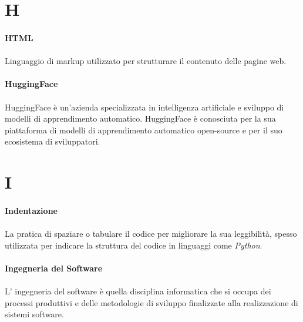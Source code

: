 \documentclass[10pt, a4paper]{article}
\begin{document}
\section{H}
\vspace{2em}
\paragraph{HTML}\noindent\hrulefill
\paragraph{}Linguaggio di markup utilizzato per strutturare il contenuto delle pagine web.

\vspace{2em}
\paragraph{HuggingFace}\noindent\hrulefill
\paragraph{}HuggingFace è un'azienda specializzata in intelligenza artificiale e sviluppo di modelli di apprendimento automatico. HuggingFace è conosciuta per la sua piattaforma di modelli di apprendimento automatico open-source e per il suo ecosistema di sviluppatori.

\newpage
\section{I}
\vspace{2em}
\paragraph{Indentazione}\noindent\hrulefill
\paragraph{}La pratica di spaziare o tabulare il codice per migliorare la sua leggibilità, spesso utilizzata per indicare la struttura del codice in linguaggi come \textit{Python\pg}.


\vspace{2em}
\paragraph{Ingegneria del Software}\noindent\hrulefill
\paragraph{}L' ingegneria del software è quella disciplina informatica che si occupa dei processi produttivi e delle metodologie di sviluppo finalizzate alla realizzazione di sistemi software.
\end{document}

